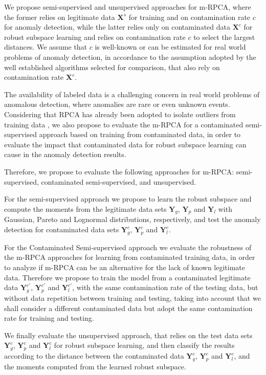 We propose semi-supervised and unsupervised approaches for m-RPCA, where the former relies on legitimate data $\pmb{X}^s$ for training and on contamination rate $c$ for anomaly detection, while the latter relies only on contaminated data $\pmb{X}^c$ for robust subspace learning and relies on contamination rate $c$ to select the largest distances. We assume that $c$ is well-known or can be estimated for real world problems of anomaly detection, in accordance to the assumption adopted by the well established algorithms \cite{zhao2019pyod} selected for comparison, that also rely on contamination rate $\pmb{X}^c$.

The availability of labeled data is a challenging concern in real world problems of anomalous detection, where anomalies are rare or even unknown events. Considering that RPCA has already been adopted to isolate outliers from training data \cite{zhou2017anomaly}, we also propose to evaluate the m-RPCA for a contaminated semi-supervised approach based on training from contaminated data, in order to evaluate the impact that contaminated data for robust subspace learning can cause in the anomaly detection results.

Therefore, we propose to evaluate the following approaches for m-RPCA: semi-supervised, contaminated semi-supervised, and unsupervised.

For the semi-supervised approach we propose to learn the robust subspace and compute the moments from the legitimate data sets $\pmb{Y}_g$, $\pmb{Y}_p$ and $\pmb{Y}_l$ with Gaussian, Pareto and Lognormal distributions, respectively, and test the anomaly detection for contaminated data sets $\pmb{Y}_g^c$, $\pmb{Y}_p^c$ and $\pmb{Y}_l^c$.

For the Contaminated Semi-supervised approach we evaluate the robustness of the m-RPCA approaches for learning from contaminated training data, in order to analyze if m-RPCA can be an alternative for the lack of known legitimate data. Therefore we propose to train the model from a contaminated legitimate data $\pmb{Y}_g^{c'}$, $\pmb{Y}_p^{c'}$ and $\pmb{Y}_l^{c'}$, with the same contamination rate of the testing data, but without data repetition between training and testing, taking into account that we shall consider a different contaminated data but adopt the same contamination rate for training and testing.

We finally evaluate the unsupervised approach, that relies on the test data sets $\pmb{Y}_g^c$, $\pmb{Y}_p^c$ and $\pmb{Y}_l^c$ for robust subspace learning, and then classify the results according to the distance between the contaminated data $\pmb{Y}_g^c$, $\pmb{Y}_p^c$ and $\pmb{Y}_l^c$, and the moments computed from the learned robust subspace.

